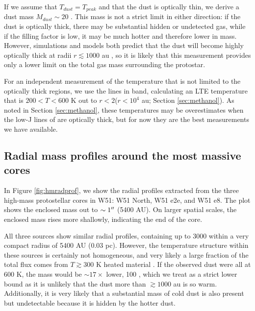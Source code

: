 \documentclass{aa}
\begin{document}
If we assume that $T_{dust} = T_{peak}$ and that the dust is optically thin, we
derive a dust mass $M_{dust}\sim20$ \msun.  This  mass is not a strict limit in
either direction: if the dust is optically thick, there may be substantial
hidden or undetected gas, while if the filling factor is low, it may be much
hotter and therefore lower in mass.  However, simulations and models both
predict that the dust will become highly optically thick at radii
$r\lesssim1000$ au \citep{Forgan2016a,Klassen2016a}, so it is likely that
this measurement provides only a lower limit on the total gas mass surrounding
the protostar.

For an independent measurement of the temperature that is not limited
to the optically thick regions, we use the \methanol
lines in band, calculating an LTE temperature that is $200 < T < 600$ K
out to $r<2$\arcsec ($r<10^4$ au; Section \ref{sec:methanol}).  As noted
in Section \ref{sec:methanol}, these temperatures may be overestimates
when the low-J lines of \methanol are optically thick, but for now they
are the best measurements we have available.



\subsection{Radial mass profiles around the most massive cores}
In Figure \ref{fig:hmradprof}, we show the radial profiles extracted from the
three high-mass protostellar cores in W51: W51 North, W51 e2e, and W51 e8.
The plot shows the enclosed mass out to $\sim1\mbox{$^{\prime\prime}$}$ (5400 AU).  On larger
spatial scales, the enclosed mass rises more shallowly, indicating the end of the
core.

All three sources show similar radial profiles, containing up to 3000 \msun
within a very compact radius of 5400 AU (0.03 pc).  However, the temperature
structure within these sources is certainly not homogeneous, and very likely a
large fraction of the total flux comes from $T\gtrsim300$ K heated material
\citep[Section \ref{sec:temperature}; ][]{Goddi2016a}.  If the observed dust were
all at 600 K, the mass would be $\sim17\times$ lower, 100 \msun, which we treat
as a strict lower bound as it is unlikely that the dust more than $\gtrsim1000$
au is so warm.  Additionally, it is very likely that a substantial mass of cold
dust is also present but undetectable because it is hidden by the hotter dust.
\end{document}
